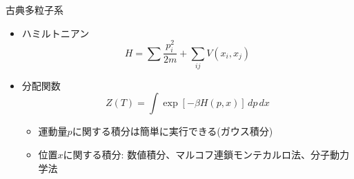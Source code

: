 
\begin{frame}[t,fragile]{古典多粒子系}
  \begin{itemize}
  \item ハミルトニアン
    \[
    H = \sum \frac{p_i^2}{2m} + \sum_{ij} V(x_i, x_j)
    \]
  \item 分配関数
    \[
    Z(T) = \int \exp [- \beta H(p,x) ] \, dp \, dx
    \]
    \begin{itemize}
    \item 運動量$p$に関する積分は簡単に実行できる(ガウス積分)
    \item 位置$x$に関する積分: 数値積分、マルコフ連鎖モンテカルロ法、分子動力学法
    \end{itemize}
  \end{itemize}
\end{frame}
